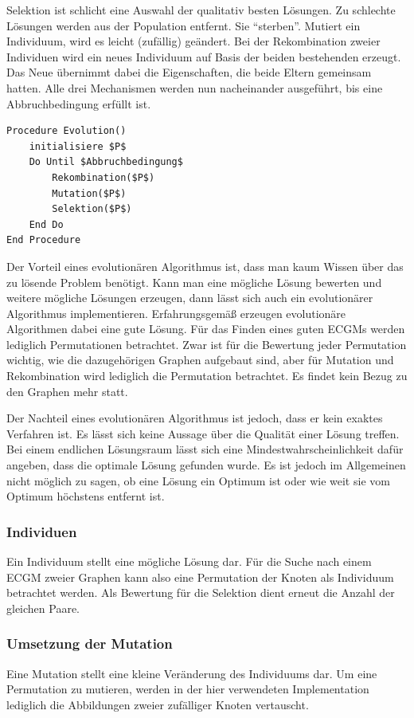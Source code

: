 Selektion ist schlicht eine Auswahl der qualitativ besten Lösungen. Zu 
schlechte Lösungen werden aus der Population entfernt. Sie "`sterben"'. 
Mutiert ein Individuum, wird es leicht (zufällig) geändert. Bei der 
Rekombination zweier Individuen wird ein neues Individuum auf Basis der 
beiden bestehenden erzeugt. Das Neue übernimmt dabei die Eigenschaften, 
die beide Eltern gemeinsam hatten. Alle drei Mechanismen werden nun 
nacheinander ausgeführt, bis eine Abbruchbedingung erfüllt ist.

\begin{lstlisting}[float=h, caption={Prinzip eines evolutionären Algorithmus},label={lst:Evo}]
Procedure Evolution()
    initialisiere $P$
    Do Until $Abbruchbedingung$
        Rekombination($P$)
        Mutation($P$)
        Selektion($P$)
    End Do
End Procedure
\end{lstlisting}

Der Vorteil eines evolutionären Algorithmus ist, dass man kaum Wissen 
über das zu lösende Problem benötigt. Kann man eine mögliche Lösung 
bewerten und weitere mögliche Lösungen erzeugen, dann lässt sich 
auch ein evolutionärer Algorithmus implementieren. Erfahrungsgemäß erzeugen 
evolutionäre Algorithmen dabei eine gute Lösung. Für das Finden eines 
guten ECGMs werden lediglich Permutationen betrachtet. Zwar ist für 
die Bewertung jeder Permutation wichtig, wie die dazugehörigen Graphen 
aufgebaut sind, aber für Mutation und Rekombination wird lediglich die 
Permutation betrachtet. Es findet kein Bezug zu den Graphen mehr statt.

Der Nachteil eines evolutionären Algorithmus ist jedoch, dass er kein 
exaktes Verfahren ist. Es lässt sich keine Aussage über die Qualität 
einer Lösung treffen. Bei einem endlichen Lösungsraum lässt sich eine 
Mindestwahrscheinlichkeit dafür angeben, dass die optimale Lösung 
gefunden wurde. Es ist jedoch im Allgemeinen nicht möglich zu sagen, 
ob eine Lösung ein Optimum ist oder wie weit sie vom Optimum höchstens 
entfernt ist. 

\subsubsection{Individuen}
Ein Individuum stellt eine mögliche Lösung dar. Für die Suche nach einem ECGM zweier 
Graphen kann also eine Permutation der Knoten als Individuum betrachtet werden. Als 
Bewertung für die Selektion dient erneut die Anzahl der gleichen Paare. 

\subsubsection{Umsetzung der Mutation}
Eine Mutation stellt eine kleine Veränderung des Individuums dar. Um eine Permutation 
zu mutieren, werden in der hier verwendeten Implementation lediglich die Abbildungen 
zweier zufälliger Knoten vertauscht. 


